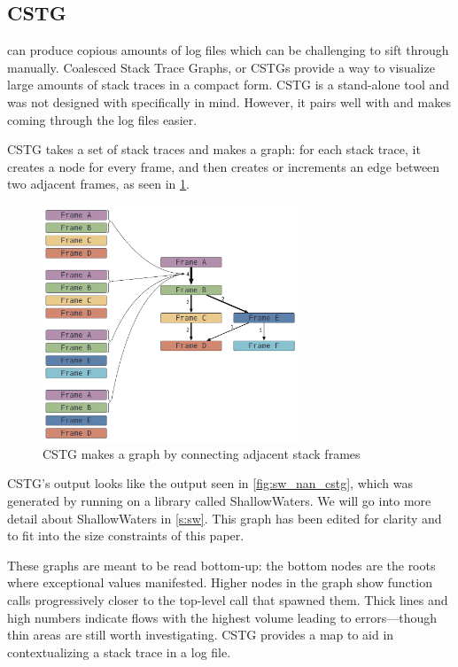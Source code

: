\documentclass{juliacon}
\begin{document}
\subsection{CSTG}
\label{s:cstg}

\FT{} can produce copious amounts of log files which can be challenging to sift through manually.
Coalesced Stack Trace Graphs, or CSTGs\cite{humphreySystematicDebuggingMethods2014} provide a way to visualize large amounts of stack traces in a compact form.
CSTG is a stand-alone tool and was not designed with \FT{} specifically in mind.
However, it pairs well with \FT{} and makes coming through the log files easier.

CSTG takes a set of stack traces and makes a graph: for each stack trace, it creates a node for every frame, and then creates or increments an edge between two adjacent frames, as seen in \cref{fig:cstg_demo}.

\begin{figure}[ht]
  \centering
  \includegraphics[width=3in]{./fig/cstg_static_diagram.png}
  \caption{CSTG makes a graph by connecting adjacent stack frames}
  \label{fig:cstg_demo}
\end{figure}

CSTG's output looks like the output seen in \cref{fig:sw_nan_cstg}, which was generated by running \FT{} on a library called ShallowWaters.
We will go into more detail about ShallowWaters in \cref{s:sw}.
This graph has been edited for clarity and to fit into the size constraints of this paper.

These graphs are meant to be read bottom-up: the bottom nodes are the roots where exceptional values manifested.
Higher nodes in the graph show function calls progressively closer to the top-level call that spawned them.
Thick lines and high numbers indicate flows with the highest volume leading to errors---though thin areas are still worth investigating.
CSTG provides a map to aid in contextualizing a stack trace in a log file.
\end{document}
